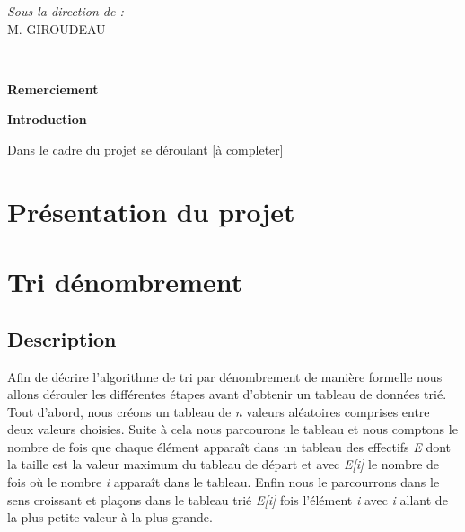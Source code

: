 \documentclass[12pt]{article}
\begin{document}
\begin{titlepage}
\begin{minipage}{0.4\textwidth}
			\begin{flushright} \large
			\emph{Sous la direction de  :} \\
			M. GIROUDEAU\\
        
		\end{flushright}
        
	\end{minipage}\\[2 cm]
	
	
    
    
    
    
	
\end{titlepage}

\LARGE\textbf{Remerciement}\\ \vspace{0.5 cm}

\newpage

\LARGE\textbf{Introduction}\\ \vspace{0.5 cm}

\normalsize{Dans le cadre du projet se déroulant  [à completer]}





\newpage

\tableofcontents

\newpage



\section{Présentation du projet}
\newpage

\section{Tri dénombrement}

\subsection{Description}



\hspace{1.0 cm} Afin de décrire l'algorithme de tri par dénombrement de manière formelle nous allons dérouler les différentes étapes avant d'obtenir un tableau de données trié. Tout d'abord, nous créons un tableau de \textit{n} valeurs aléatoires comprises entre deux valeurs choisies. Suite à cela nous parcourons le tableau et nous comptons le nombre de fois que chaque élément apparaît dans un tableau des effectifs \textit{E} dont la taille est la valeur maximum du tableau de départ et avec \textit{E[i] }le nombre de fois où le nombre \textit{i} apparaît dans le tableau.
Enfin nous le parcourrons dans le sens croissant et plaçons dans le tableau trié \textit{E[i]} fois l’élément \textit{i} avec \textit{i} allant de la plus petite valeur à la plus grande.
\end{document}
